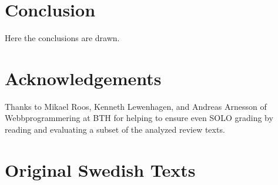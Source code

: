 \documentclass[twoside,twocolumn,a4paper,11pt,english]{article}
\begin{document}

\section{Conclusion}

Here the conclusions are drawn.




\section{Acknowledgements}

Thanks to Mikael Roos, Kenneth Lewenhagen, and Andreas Arnesson of Webbprogrammering at BTH for helping to ensure even SOLO grading by reading and evaluating a subset of the analyzed review texts.








\appendix

\section{Original Swedish Texts} \label{app:original}
\end{document}
